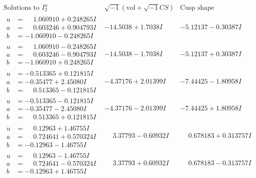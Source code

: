 \documentclass[1p]{elsarticle_modified}
\theoremstyle{definition}
\newcommand{\I}{\sqrt{-1}}
\begin{document}
$$\begin{array}{c|c|c}  
\text{Solutions to }I^u_{2}& \I (\text{vol} + \sqrt{-1}CS) & \text{Cusp shape}\\
 \hline 
\begin{aligned}
u &= \phantom{-}1.060910 + 0.248265 I \\
a &= \phantom{-}0.603246 + 0.904793 I \\
b &= -1.060910 - 0.248265 I\end{aligned}
 & -14.5038 + 1.7038 I & -5.12137 - 0.30387 I \\ \hline\begin{aligned}
u &= \phantom{-}1.060910 - 0.248265 I \\
a &= \phantom{-}0.603246 - 0.904793 I \\
b &= -1.060910 + 0.248265 I\end{aligned}
 & -14.5038 - 1.7038 I & -5.12137 + 0.30387 I \\ \hline\begin{aligned}
u &= -0.513365 + 0.121815 I \\
a &= -0.35477 + 2.45080 I \\
b &= \phantom{-}0.513365 - 0.121815 I\end{aligned}
 & -4.37176 + 2.01399 I & -7.44425 - 1.80958 I \\ \hline\begin{aligned}
u &= -0.513365 - 0.121815 I \\
a &= -0.35477 - 2.45080 I \\
b &= \phantom{-}0.513365 + 0.121815 I\end{aligned}
 & -4.37176 - 2.01399 I & -7.44425 + 1.80958 I \\ \hline\begin{aligned}
u &= \phantom{-}0.12963 + 1.46755 I \\
a &= \phantom{-}0.724641 + 0.570324 I \\
b &= -0.12963 - 1.46755 I\end{aligned}
 & \phantom{-}3.37793 - 0.60932 I & \phantom{-}0.678183 + 0.313757 I \\ \hline\begin{aligned}
u &= \phantom{-}0.12963 - 1.46755 I \\
a &= \phantom{-}0.724641 - 0.570324 I \\
b &= -0.12963 + 1.46755 I\end{aligned}
 & \phantom{-}3.37793 + 0.60932 I & \phantom{-}0.678183 - 0.313757 I \\ \hline\begin{aligned}

\end{aligned}
\end{array}$$
\end{document}
